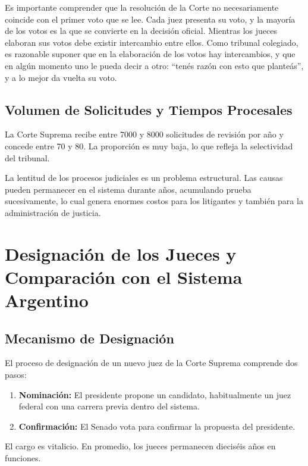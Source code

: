 \documentclass[12pt,oneside]{book}
\begin{document}
Es importante comprender que la resolución de la Corte no necesariamente coincide con el primer voto que se lee. Cada juez presenta su voto, y la mayoría de los votos es la que se convierte en la decisión oficial. Mientras los jueces elaboran sus votos debe existir intercambio entre ellos. Como tribunal colegiado, es razonable suponer que en la elaboración de los votos hay intercambios, y que en algún momento uno le pueda decir a otro: ``tenés razón con esto que planteás'', y a lo mejor da vuelta su voto.

\subsection{Volumen de Solicitudes y Tiempos Procesales}

La Corte Suprema recibe entre 7000 y 8000 solicitudes de revisión por año y concede entre 70 y 80. La proporción es muy baja, lo que refleja la selectividad del tribunal.

\begin{note}
La lentitud de los procesos judiciales es un problema estructural. Las causas pueden permanecer en el sistema durante años, acumulando prueba sucesivamente, lo cual genera enormes costos para los litigantes y también para la administración de justicia.
\end{note}

\section{Designación de los Jueces y Comparación con el Sistema Argentino}

\subsection{Mecanismo de Designación}

El proceso de designación de un nuevo juez de la Corte Suprema comprende dos pasos:

\begin{enumerate}
    \item \textbf{Nominación:} El presidente propone un candidato, habitualmente un juez federal con una carrera previa dentro del sistema.
    \item \textbf{Confirmación:} El Senado vota para confirmar la propuesta del presidente.
\end{enumerate}

El cargo es vitalicio. En promedio, los jueces permanecen dieciséis años en funciones.
\end{document}
